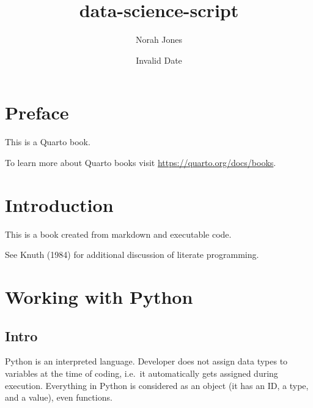 \documentclass[
  letterpaper,
  DIV=11,
  numbers=noendperiod]{scrreprt}
\title{data-science-script}
\author{Norah Jones}
\date{Invalid Date}
\renewcommand*\contentsname{Table of contents}
\newcommand\contentsname{Table of contents}
\begin{document}
\maketitle
\ifdefined\Shaded\renewenvironment{Shaded}{\begin{tcolorbox}[borderline west={3pt}{0pt}{shadecolor}, interior hidden, enhanced, sharp corners, breakable, boxrule=0pt, frame hidden]}{\end{tcolorbox}}\fi

\renewcommand*\contentsname{Table of contents}
{
\hypersetup{linkcolor=}
\setcounter{tocdepth}{2}
\tableofcontents
}

\hypertarget{preface}{%
\chapter*{Preface}\label{preface}}


This is a Quarto book.

To learn more about Quarto books visit
\url{https://quarto.org/docs/books}.


\hypertarget{introduction}{%
\chapter{Introduction}\label{introduction}}

This is a book created from markdown and executable code.

See Knuth (1984) for additional discussion of literate programming.


\hypertarget{working-with-python}{%
\chapter{Working with Python}\label{working-with-python}}

\hypertarget{intro}{%
\section{Intro}\label{intro}}

Python is an interpreted language. Developer does not assign data types
to variables at the time of coding, i.e.~it automatically gets assigned
during execution. Everything in Python is considered as an object (it
has an ID, a type, and a value), even functions.
\end{document}
